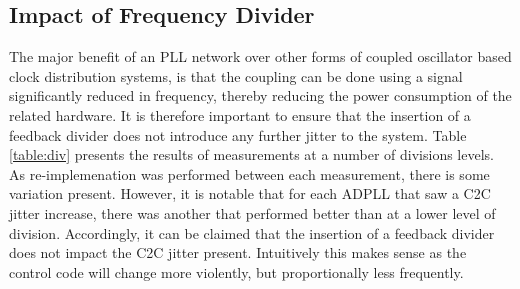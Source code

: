 \subsection{Impact of Frequency Divider}
The major benefit of an \ac{PLL} network over other forms of coupled oscillator based clock distribution systems, is that the coupling can be done using a signal significantly reduced in frequency, thereby reducing the power consumption of the related hardware. It is therefore important to ensure that the insertion of a feedback divider does not introduce any further jitter to the system. Table \ref{table:div} presents the results of measurements at a number of divisions levels. As re-implemenation was performed between each measurement, there is some variation present. However, it is notable that for each \ac{ADPLL} that saw a \ac{C2C} jitter increase, there was another that performed better than at a lower level of division. Accordingly, it can be claimed that the insertion of a feedback divider does not impact the \ac{C2C} jitter present. Intuitively this makes sense as the control code will change more violently, but proportionally less frequently. 
